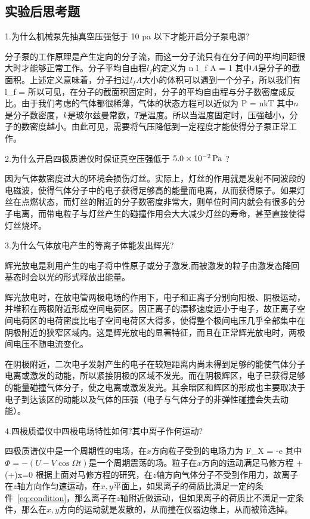 \documentclass{ctexart}
\begin{document}
\subsection{实验后思考题}
1.为什么机械泵先抽真空压强低于 10 pa 以下才能开启分子泵电源?

分子泵的工作原理是产生定向的分子流，而这一分子流只有在分子间的平均间距很大时才能够正常工作。分子平均自由程$l_f$的定义为
\beq
n l_f A = 1
\eeq
其中$A$是分子的截面积。上述定义意味着，分子扫过$l_f A$大小的体积可以遇到一个分子，所以我们有
\beq
l_f = 
\eeq
所以可见，在分子的截面积固定时，分子的平均自由程与分子数密度成反比。由于我们考虑的气体都很稀薄，气体的状态方程可以近似为
\beq
P = nkT
\eeq
其中$n$是分子数密度，$k$是玻尔兹曼常数，$T$是温度。所以当温度固定时，压强越小，分子的数密度越小。由此可见，需要将气压降低到一定程度才能使得分子泵正常工作。

2.为什么开启四极质谱仪时保证真空压强低于 $5.0\times 10^{-2}\,\mathrm{Pa}$ ?

因为气体数密度过大的环境会损伤灯丝。实际上，灯丝的作用就是发射不同波段的电磁波，使得气体分子中的电子获得足够高的能量而电离，从而获得原子。如果灯丝在点燃状态，而灯丝的附近的分子数密度非常大，则单位时间内就会有很多的分子电离，而带电粒子与灯丝产生的碰撞作用会大大减少灯丝的寿命，甚至直接使得灯丝烧坏。

3.为什么气体放电产生的等离子体能发出辉光?

辉光放电是利用产生的电子将中性原子或分子激发,而被激发的粒子由激发态降回基态时会以光的形式释放出能量。

辉光放电时，在放电管两极电场的作用下，电子和正离子分别向阳极、阴极运动，并堆积在两极附近形成空间电荷区。因正离子的漂移速度远小于电子，故正离子空间电荷区的电荷密度比电子空间电荷区大得多，使得整个极间电压几乎全部集中在阴极附近的狭窄区域内。这是辉光放电的显著特征，而且在正常辉光放电时，两极间电压不随电流变化。

在阴极附近，二次电子发射产生的电子在较短距离内尚未得到足够的能使气体分子电离或激发的动能，所以紧接阴极的区域不发光。而在阴极辉区，电子已获得足够的能量碰撞气体分子，使之电离或激发发光。其余暗区和辉区的形成也主要取决于电子到达该区的动能以及气体的压强（电子与气体分子的非弹性碰撞会失去动能）。

4.四极质谱仪中四极电场特性如何?其中离子作何运动?

四极质谱仪中是一个周期性的电场，在$x$方向粒子受到的电场力为
\beq
F_X = -e
\eeq
其中$\Phi = -(U-V\cos\Omega t)$是一个周期震荡的场。粒子在$x$方向的运动满足马修方程
\beq
{}+\left(+\right)x=0
\eeq
根据上面对马修方程的研究，在$z$轴方向气体分子不受到作用力，故离子在$z$轴方向作匀速运动，在$x,y$平面上，如果离子的荷质比满足一定的条件~\ref{eq:condition}，那么离子在$z$轴附近做运动，但如果离子的荷质比不满足一定条件，那么在$x,y$方向的运动就是发散的，从而撞在仪器边缘上，从而被筛选掉。


\end{document}
